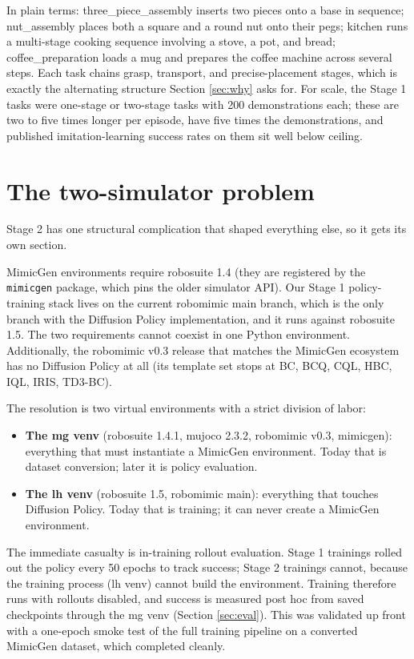 \documentclass[11pt]{article}
\begin{document}
In plain terms: three\_piece\_assembly inserts two pieces onto a base in
sequence; nut\_assembly places both a square and a round nut onto their pegs;
kitchen runs a multi-stage cooking sequence involving a stove, a pot, and
bread; coffee\_preparation loads a mug and prepares the coffee machine across
several steps. Each task chains grasp, transport, and precise-placement stages,
which is exactly the alternating structure Section \ref{sec:why} asks for. For
scale, the Stage 1 tasks were one-stage or two-stage tasks with 200
demonstrations each; these are two to five times longer per episode, have five
times the demonstrations, and published imitation-learning success rates on
them sit well below ceiling.

\section{The two-simulator problem}
\label{sec:venv}

Stage 2 has one structural complication that shaped everything else, so it gets
its own section.

MimicGen environments require robosuite 1.4 (they are registered by the
\texttt{mimicgen} package, which pins the older simulator API). Our Stage 1
policy-training stack lives on the current robomimic main branch, which is the
only branch with the Diffusion Policy implementation, and it runs against
robosuite 1.5. The two requirements cannot coexist in one Python environment.
Additionally, the robomimic v0.3 release that matches the MimicGen ecosystem
has no Diffusion Policy at all (its template set stops at BC, BCQ, CQL, HBC,
IQL, IRIS, TD3-BC).

The resolution is two virtual environments with a strict division of labor:

\begin{itemize}[leftmargin=2em]
  \item \textbf{The mg venv} (robosuite 1.4.1, mujoco 2.3.2, robomimic v0.3,
        mimicgen): everything that must instantiate a MimicGen environment.
        Today that is dataset conversion; later it is policy evaluation.
  \item \textbf{The lh venv} (robosuite 1.5, robomimic main): everything that
        touches Diffusion Policy. Today that is training; it can never create a
        MimicGen environment.
\end{itemize}

The immediate casualty is in-training rollout evaluation. Stage 1 trainings
rolled out the policy every 50 epochs to track success; Stage 2 trainings
cannot, because the training process (lh venv) cannot build the environment.
Training therefore runs with rollouts disabled, and success is measured post
hoc from saved checkpoints through the mg venv (Section \ref{sec:eval}). This
was validated up front with a one-epoch smoke test of the full training
pipeline on a converted MimicGen dataset, which completed cleanly.
\end{document}
